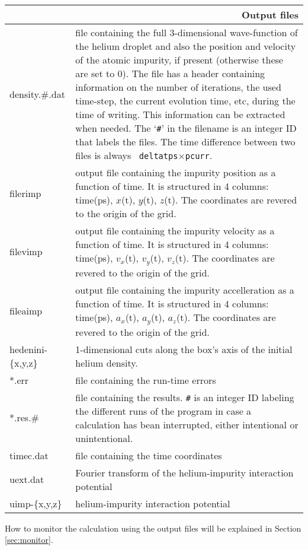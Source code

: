 \documentclass[10pt,a4paper]{article}
\begin{document}
	\begin{center}
		\begin{tabular}{l|p{8.75cm}}
			\multicolumn{2}{r}{\textbf{Output files}} \\
			\hline\hline
			density.\#.dat	& file containing the full 3-dimensional wave-function of the helium droplet and also the position and velocity of the atomic impurity, if present (otherwise these are set to 0). The file has a  header containing information on the number of iterations, the used time-step, the current evolution time, etc, during the time of writing. This information can be extracted when needed. The `\verb|#|' in the filename is an integer ID that labels the files. The time difference between two files is always \verb| deltatps|$\times$\verb|pcurr|. \\
			filerimp	& output file containing the impurity position as a function of time. It is structured in 4 columns: time(ps), $x$(t), $y$(t), $z$(t). The coordinates are revered to the origin of the grid.\\
			filevimp	& output file containing the impurity velocity as a function of time. It is structured in 4 columns: time(ps), $v_x$(t), $v_y$(t), $v_z$(t). The coordinates are revered to the origin of the grid.\\
			fileaimp	& output file containing the impurity accelleration as a function of time. It is structured in 4 columns: time(ps), $a_x$(t), $a_y$(t), $a_z$(t). The coordinates are revered to the origin of the grid.\\
			hedenini-\{x,y,z\}	& 1-dimensional cuts along the box's axis of the initial helium density.\\
			*.err	& file containing the run-time errors\\
			*.res.\#	& file containing the results. \verb|#| is an integer ID labeling the different runs of the program in case a calculation has bean interrupted, either intentional or unintentional.\\
			timec.dat	& file containing the time coordinates\\
			uext.dat	& Fourier transform of the helium-impurity interaction potential\\
			uimp-\{x,y,z\} & helium-impurity interaction potential \\		
		\end{tabular}
	\end{center}
	\vspace{10px}

	How to monitor the calculation using the output files will be explained in Section \ref{sec:monitor}.
	
\end{document}
